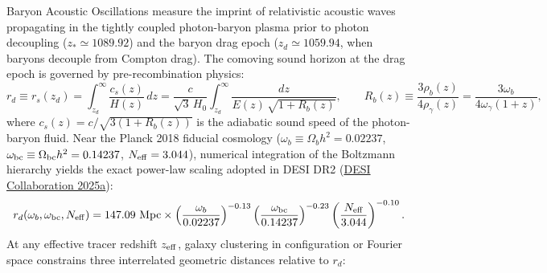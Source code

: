 \documentclass[11pt,letterpaper]{article}
\begin{document}
Baryon Acoustic Oscillations measure the imprint of relativistic acoustic waves propagating in the tightly coupled photon-baryon plasma prior to photon decoupling ($z_* \simeq 1089.92$) and the baryon drag epoch ($z_d \simeq 1059.94$, when baryons decouple from Compton drag). The comoving sound horizon at the drag epoch is governed by pre-recombination physics:
\begin{equation}
    r_d \equiv r_s(z_d) = \int_{z_d}^\infty \frac{c_s(z)}{H(z)}\, dz = \frac{c}{\sqrt{3}\, H_0} \int_{z_d}^\infty \frac{dz}{E(z)\, \sqrt{1 + R_b(z)}}, \qquad R_b(z) \equiv \frac{3\rho_b(z)}{4\rho_\gamma(z)} = \frac{3\omega_b}{4\omega_\gamma (1+z)},
    \label{eq:rd_integral}
\end{equation}
where $c_s(z) = c / \sqrt{3(1 + R_b(z))}$ is the adiabatic sound speed of the photon-baryon fluid. Near the Planck 2018 fiducial cosmology ($\omega_b \equiv \Omega_b h^2 = 0.02237$, $\omega_{\rm bc} \equiv \Omega_{\rm bc} h^2 = 0.14237$, $N_{\rm eff} = 3.044$), numerical integration of the Boltzmann hierarchy yields the exact power-law scaling adopted in DESI DR2 (\href{https://arxiv.org/abs/2503.14738}{DESI Collaboration 2025a}):
\begin{equation}
    r_d(\omega_b, \omega_{\rm bc}, N_{\rm eff}) = 147.09\text{ Mpc} \times \left(\frac{\omega_b}{0.02237}\right)^{-0.13} \left(\frac{\omega_{\rm bc}}{0.14237}\right)^{-0.23} \left(\frac{N_{\rm eff}}{3.044}\right)^{-0.10}.
    \label{eq:rd_scaling}
\end{equation}
At any effective tracer redshift $z_{\rm eff}$, galaxy clustering in configuration or Fourier space constrains three interrelated geometric distances relative to $r_d$:
\end{document}
